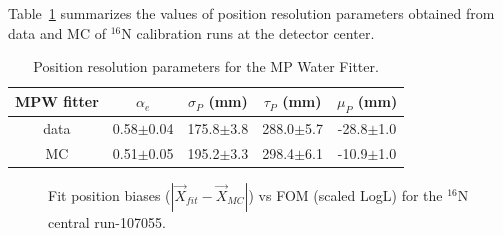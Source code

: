 Table~\ref{table_posresol} summarizes the values of position resolution parameters obtained from data and MC of {$^{16}$}N calibration runs at the detector center.
\vspace{1mm}
\begin{table}[ht]
	\centering
	\caption{Position resolution parameters for the MP Water Fitter.}
	\label{table_posresol}
	\begin{tabular}{ccccc}
		\toprule
		MPW fitter & $\alpha_e$ & $\sigma_P$ (mm) &  $\tau_P$ (mm)& $\mu_P$ (mm)\\
		\hline 
		data& 0.58$\pm$0.04 & 175.8$\pm$3.8 & 288.0$\pm$5.7 & -28.8$\pm$1.0\\	
		\hline 
		MC & 0.51$\pm$0.05 & 195.2$\pm$3.3 & 298.4$\pm$6.1 & -10.9$\pm$1.0\\
		\bottomrule
	\end{tabular}
\end{table}
\vspace{1mm}





\begin{figure}
	\caption{Fit position biases ($|\vec{X}_{fit}-\vec{X}_{MC}|$) vs FOM (scaled LogL) for the $^{16}$N central run-107055.}
	\label{posBiasVsFOM}
\end{figure}



